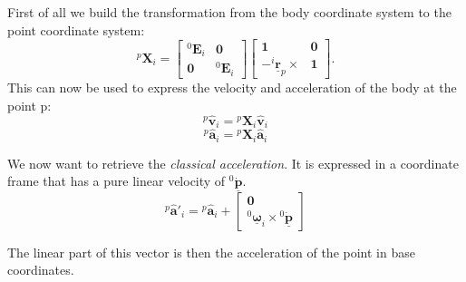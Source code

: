 \documentclass[a4paper]{article}
\newcommand{\Spa}[1]{\mathbf{\hat{#1}}}
\newcommand{\Nspa}[1]{\mathbf{\underline{#1}}}
\newcommand{\Vec}[1]{\mathbf{#1}}
\begin{document}
First of all we build the transformation from the body coordinate system to
the point coordinate system:
\begin{equation}
	{^p}\Vec{X}_i =
	\left[
	\begin{array}{cc}
		{^0}\Vec{E}_i & \Vec{0} \\
		\Vec{0} & {^0}\Vec{E}_i
	\end{array}
	\right]
	\left[
	\begin{array}{cc}
		\Vec{1} & \Vec{0} \\
		-{^i}\Nspa{r}_p \times & \Vec{1}
	\end{array}
	\right].
\end{equation}
This can now be used to express the velocity and acceleration of the body at
the point p:
\begin{equation}
	{^p}\Spa{v}_i = {^p}\Vec{X}_i \Spa{v}_i
\end{equation}
\begin{equation}
	{^p}\Spa{a}_i = {^p}\Vec{X}_i \Spa{a}_i
\end{equation}

We now want to retrieve the \emph{classical acceleration}. It is expressed in a
coordinate frame that has a pure linear velocity of ${^0}\Nspa{\dot{p}}$.
\begin{equation}
	{^p}\Spa{a}'_i = {^p}\Spa{a}_i + 
	\left[
	\begin{array}{c}
		\Vec{0}\\
		{^0}\Nspa{\omega}_i \times {^0}\Nspa{\dot{p}}
	\end{array}
	\right]
\end{equation}

The linear part of this vector is then the acceleration of the point in base
coordinates.
\end{document}
